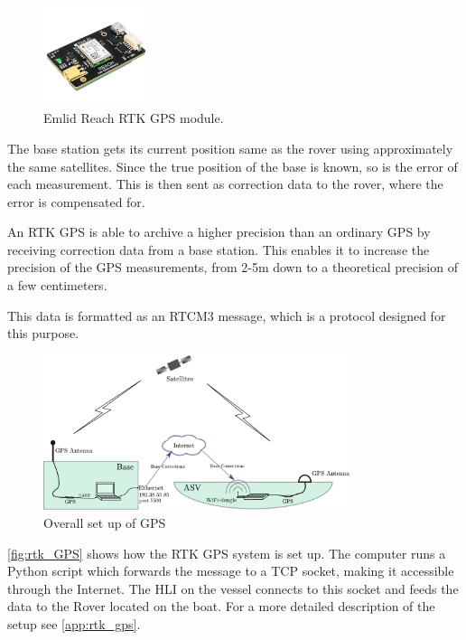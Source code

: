 \begin{figure}[H]
  \includegraphics[width=0.27\textwidth]{figures/emlidReach}
  \caption{Emlid Reach RTK GPS module.\cite{EmlidRTK}}
  \label{fig:emlidReach}
\end{figure}

The base station gets its current position same as the rover using approximately the same satellites. Since the true position of the base is known, so is the error of each measurement. This is then sent as correction data to the rover, where the error is compensated for.%

An RTK GPS is able to archive a higher precision than an ordinary GPS by receiving correction data from a base station.
This enables it to increase the precision of the GPS measurements, from 2-5m down to a theoretical precision of a few centimeters.\cite{EmlidRTK}

This data is formatted as an RTCM3 message, which is a protocol designed for this purpose.
\begin{figure}[H]
	\includegraphics[width=0.8\textwidth]{figures/comunicationSetup.pdf}
	\caption{Overall set up of GPS}
	\label{fig:rtk_GPS}
\end{figure}
\autoref{fig:rtk_GPS} shows how the RTK GPS system is set up. 
The computer runs a Python script which forwards the message to a TCP socket, making it accessible through the Internet. 
The HLI on the vessel connects to this socket and feeds the data to the Rover located on the boat.
For a more detailed description of the setup see \autoref{app:rtk_gps}.
